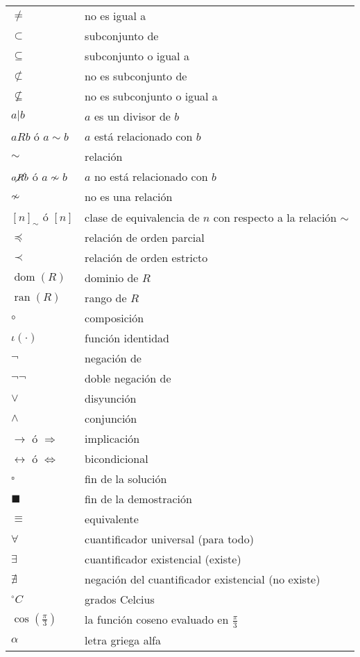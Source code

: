 \begin{longtable}{p{2cm}p{9cm}}
$\not=$ & no es igual a \\
$\subset$ & subconjunto de \\
$\subseteq$ & subconjunto o igual a \\
$\not\subset$ & no es subconjunto de \\
$\not\subseteq$ & no es subconjunto o igual a \\
$a|b$ & $a$ es un divisor de $b$\\
$aRb$ ó $a\sim b$ & $a$ está relacionado con $b$\\
$\sim$ & relación \\
$a\cancel{R}b$ ó $a\not\sim b$ & $a$ no está relacionado con $b$\\
$\not\sim$ & no es una relación \\
$[n]_{\sim}$ ó $[n]$ & clase de equivalencia de $n$ con respecto a la relación $\sim$\\
$\preccurlyeq$ & relación de orden parcial \\
$\prec$ & relación de orden estricto \\
$\operatorname{dom}(R)$ & dominio de $R$ \\
$\operatorname{ran}(R)$ & rango de $R$\\
$\circ$ & composición \\
$\iota(\cdot)$ & función identidad \\
$\neg$ & negación de \\
$\neg\neg$ & doble negación de \\
$\vee$ & disyunción \\
$\wedge$ & conjunción \\
$\longrightarrow$ ó $\Longrightarrow$ & implicación \\
$\longleftrightarrow$ ó $\Longleftrightarrow$ & bicondicional \\
$\square$ & fin de la solución \\
$\blacksquare$ & fin de la demostración \\
$\equiv$ & equivalente \\
$\forall$ & cuantificador universal (para todo) \\
$\exists$ & cuantificador existencial (existe) \\
$\nexists$ & negación del cuantificador existencial (no existe) \\
$^\circ C$ & grados Celcius\\
$\cos(\frac{\pi}{3})$ & la función coseno evaluado en $\frac{\pi}{3}$ \\
$\alpha$ & letra griega alfa \\

\end{longtable}
